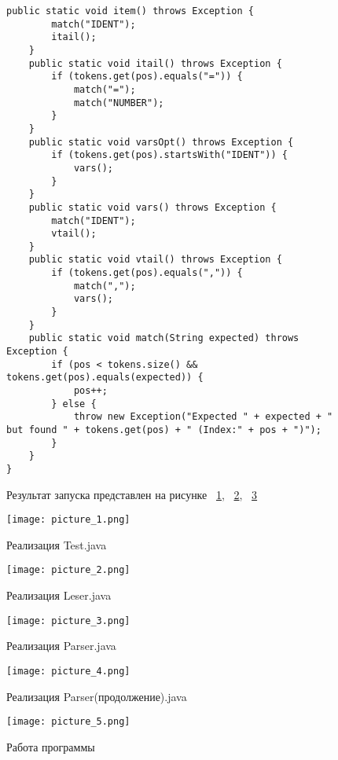 \documentclass[a4paper, 14pt]{extarticle}
\begin{document}
\begin{figure}[!htb]
\begin{lstlisting}[language={},caption={класс Parser.java(продолжение)},label={lst:code3}]
    public static void item() throws Exception {
        match("IDENT");
        itail();
    }
    public static void itail() throws Exception {
        if (tokens.get(pos).equals("=")) {
            match("=");
            match("NUMBER");
        }
    }
    public static void varsOpt() throws Exception {
        if (tokens.get(pos).startsWith("IDENT")) {
            vars();
        }
    }
    public static void vars() throws Exception {
        match("IDENT");
        vtail();
    }
    public static void vtail() throws Exception {
        if (tokens.get(pos).equals(",")) {
            match(",");
            vars();
        }
    }
    public static void match(String expected) throws Exception {
        if (pos < tokens.size() && tokens.get(pos).equals(expected)) {
            pos++;
        } else {
            throw new Exception("Expected " + expected + " but found " + tokens.get(pos) + " (Index:" + pos + ")");
        }
    }
}
\end{lstlisting}
\end{figure}

\begin{figure}[!htb]
Результат запуска представлен на рисунке ~\ref{fig:picture_1.png}, ~\ref{fig:picture_2.png}, ~\ref{fig:picture_3.png}
\end{figure}

\begin{figure}[!htb]
	\centering
	\texttt{[image: picture\_1.png]}
\caption{Реализация Test.java}
\label{fig:picture_1.png}
\end{figure}

\begin{figure}[!htb]
	\centering
	\texttt{[image: picture\_2.png]}
\caption{Реализация Leser.java}
\label{fig:picture_2.png}
\end{figure}

\begin{figure}[!htb]
	\centering
	\texttt{[image: picture\_3.png]}
\caption{Реализация Parser.java}
\label{fig:picture_3.png}
\end{figure}

\begin{figure}[!htb]
	\centering
	\texttt{[image: picture\_4.png]}
\caption{Реализация Parser(продолжение).java}
\label{fig:picture_4.png}
\end{figure}

\begin{figure}[!htb]
	\centering
	\texttt{[image: picture\_5.png]}
\caption{Работа программы}
\label{fig:picture_5.png}
\end{figure}
\end{document}
